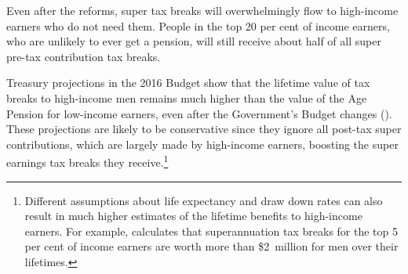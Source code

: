 \documentclass[continuous]{grattan}\usepackage[]{graphicx}\usepackage[]{color}
\begin{document}
Even after the reforms, super tax breaks will overwhelmingly flow to high-income earners who do not need them. 
People in the top 20 per cent of income earners, who are unlikely to ever get a pension, will still receive about half of all super pre-tax contribution tax breaks.

Treasury projections in the 2016 Budget show that the lifetime value of tax breaks to high-income men remains much higher than the value of the Age Pension for low-income earners, even after the Government's Budget changes (). %
These projections are likely to be conservative since they ignore all post-tax super contributions, which are largely made by high-income earners, boosting the super earnings tax breaks they receive.\footnote{Different assumptions about life expectancy and draw down rates can also result in much higher estimates of the lifetime benefits to high-income earners. For example, \textcite{Industry-Super-2015-Off-target-current-settings} calculates that superannuation tax breaks for the top 5 per cent of income earners are worth more than \$2~million for men over their lifetimes.}
\end{document}
